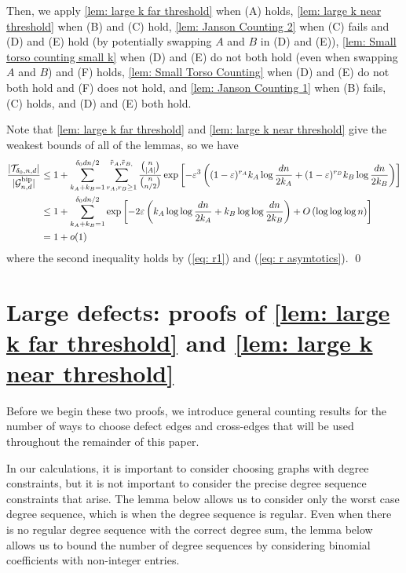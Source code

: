 \documentclass[11pt]{article}
\newcommand{\overbar}[1]{\mkern 1.5mu\overline{\mkern-1.5mu#1\mkern-1.5mu}\mkern 1.5mu}
\theoremstyle{plain}
\begin{document}
Then, we apply \cref{lem: large k far threshold} when (A) holds, \cref{lem: large k near threshold} when (B) and (C) hold, \cref{lem: Janson Counting 2} when (C) fails and (D) and (E) hold (by potentially swapping $A$ and $B$ in (D) and (E)), \cref{lem: Small torso counting small k} when (D) and (E) do not both hold (even when swapping $A$ and $B$) and (F) holds, \cref{lem: Small Torso Counting} when (D) and (E) do not both hold and (F) does not hold, and \cref{lem: Janson Counting 1} when (B) fails, (C) holds, and (D) and (E) both hold. 


Note that \cref{lem: large k far threshold} and \cref{lem: large k near threshold} give the weakest bounds of all of the lemmas, so we have
\begin{align*}
    \frac{|\mathcal T_{\delta_0, n, d}|}{|\mathcal G_{n,d}^\text{bip}|}
    &\leq1 + \sum_{k_A + k_B = 1}^{\delta_0dn/2}\sum_{r_A, r_B \geq 1}^{\overbar{r}_{A}, \overbar{r}_{B, }}\frac{\binom{n}{|A|}}{\binom{n}{n/2}}\exp\left[-{\varepsilon^3}\left((1 - \varepsilon)^{r_A}k_A\log\frac{dn}{2k_A} + (1 - \varepsilon)^{r_B}k_B\log\frac{dn}{2k_B}\right)\right]\\
    &\leq1 +  \sum_{k_A + k_B = 1}^{\delta_0dn/2}\exp\left[-2\varepsilon\left(k_A\log\log\frac{dn}{2k_A} + k_B\log\log\frac{dn}{2k_B}\right) + O\left( \log\log\log n\right)\right]\\
    &= 1 + o(1)
\end{align*}
where the second inequality holds by (\ref{eq: r1}) and (\ref{eq: r asymtotics}). \qed






\section{Large defects: proofs of \cref{lem: large k far threshold} and \cref{lem: large k near threshold} } \label{sec: Large k}

Before we begin these two proofs, we introduce general counting results for the number of ways to choose defect edges and cross-edges that will be used throughout the remainder of this paper. 


In our calculations, it is important to consider choosing graphs with degree constraints, but it is not important to consider the precise degree sequence constraints that arise. The lemma below allows us to consider only the worst case degree sequence, which is when the degree sequence is regular. Even when there is no regular degree sequence with the correct degree sum, the lemma below allows us to bound the number of degree sequences by considering binomial coefficients with non-integer entries.
\end{document}
